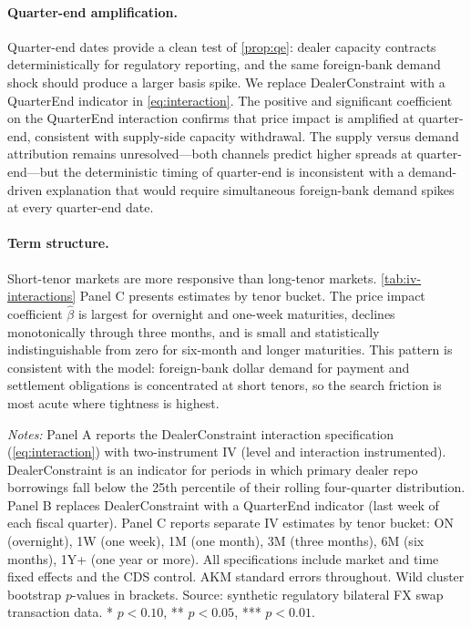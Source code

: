 \paragraph{Quarter-end amplification.} Quarter-end dates provide a clean test
of \cref{prop:qe}: dealer capacity contracts deterministically for regulatory
reporting, and the same foreign-bank demand shock should produce a larger basis
spike. We replace DealerConstraint with a QuarterEnd indicator in
\cref{eq:interaction}. The positive and significant coefficient on the QuarterEnd
interaction confirms that price impact is amplified at quarter-end, consistent
with supply-side capacity withdrawal. The supply versus demand attribution remains
unresolved---both channels predict higher spreads at quarter-end---but the
deterministic timing of quarter-end is inconsistent with a demand-driven
explanation that would require simultaneous foreign-bank demand spikes at every
quarter-end date.

\paragraph{Term structure.} Short-tenor markets are more responsive than
long-tenor markets. \cref{tab:iv-interactions} Panel C presents estimates
by tenor bucket. The price impact coefficient $\hat\beta$ is largest for overnight
and one-week maturities, declines monotonically through three months, and is
small and statistically indistinguishable from zero for six-month and longer
maturities. This pattern is consistent with the model: foreign-bank dollar
demand for payment and settlement obligations is concentrated at short tenors,
so the search friction is most acute where tightness is highest.

\begin{table}[htbp]
\centering
\begin{threeparttable}
\caption{Heterogeneity in Price Impact: Capacity, Quarter-End, and Tenor}
\label{tab:iv-interactions}

\begin{tablenotes}\small
\item \textit{Notes:} Panel A reports the DealerConstraint interaction
specification (\cref{eq:interaction}) with two-instrument IV (level and
interaction instrumented). DealerConstraint is an indicator for periods in which
primary dealer repo borrowings fall below the 25th percentile of their
rolling four-quarter distribution. Panel B replaces DealerConstraint with a
QuarterEnd indicator (last week of each fiscal quarter). Panel C reports
separate IV estimates by tenor bucket: ON (overnight), 1W (one week), 1M (one
month), 3M (three months), 6M (six months), 1Y+ (one year or more). All
specifications include market and time fixed effects and the CDS control.
AKM standard errors throughout. Wild cluster bootstrap $p$-values in brackets.
Source: synthetic regulatory bilateral FX swap transaction data.
* $p < 0.10$, ** $p < 0.05$, *** $p < 0.01$.
\end{tablenotes}
\end{threeparttable}
\end{table}

